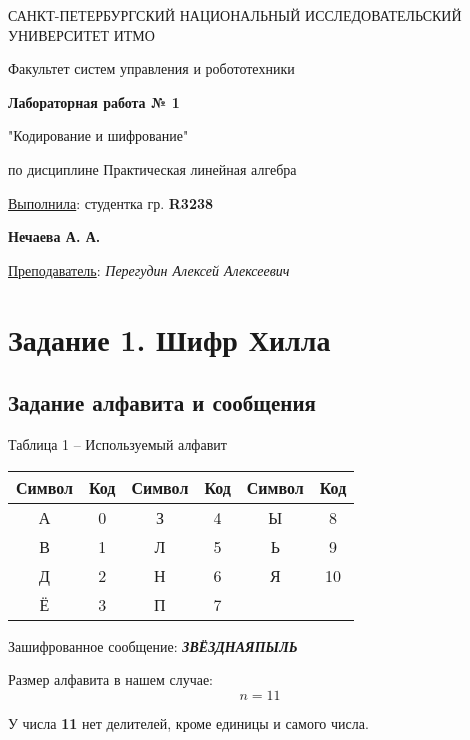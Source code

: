 \documentclass[a5paper, 10pt]{article}
\theoremstyle{definition}
\theoremstyle{plain}
\theoremstyle{remark}
\newcommand*{\titlePage}{
	\thispagestyle{title}
	\begingroup
	\begin{center}
		\vspace*{6ex}
		
		{\small
			САНКТ-ПЕТЕРБУРГСКИЙ НАЦИОНАЛЬНЫЙ ИССЛЕДОВАТЕЛЬСКИЙ УНИВЕРСИТЕТ ИТМО	
		}
		
		\vspace*{2ex}
		
		{\normalsize
			Факультет систем управления и робототехники
		}
		
		\vspace*{15ex}
		
		{\Large \bfseries 
			Лабораторная работа № 1
		}
\vspace*{2ex}
	{\Large \bfseries 
			
"Кодирование и шифрование"
		}
\vspace*{2ex}
		
		{\normalsize
			по дисциплине Практическая линейная алгебра
		}

	\end{center}
	\vspace*{20ex}
	\begin{flushright}
		{\large 
			\underline{Выполнила}: студентка гр. \textbf{R3238}\\
			\begin{flushright}
				\textbf{Нечаева А. А.}\\
			\end{flushright}
		}
		
		\vspace*{5ex}
		
		{\large 
			\underline{Преподаватель}: \textit{Перегудин Алексей Алексеевич}
		}
	\end{flushright}	
	\newpage
	\setcounter{page}{1}
	\endgroup}
\begin{document}
	\titlePage
	\pagestyle{style}
\newpage

\section{Задание 1. Шифр Хилла}
\subsection{Задание алфавита и сообщения}



\begin{center}
Таблица 1 -- Используемый алфавит\\
\begin{tabular}{ |c|c|c|c|c|c| } 
 \hline
Символ & Код & Символ & Код & Символ & Код\\
\hline
А & 0 & З  & 4 & Ы  & 8 \\
 \hline
В & 1 & Л & 5& Ь  & 9  \\
 \hline
Д & 2 & Н & 6& Я  & 10  \\
 \hline
Ё & 3 & П & 7&   &   \\
 \hline
\end{tabular}
\end{center}

Зашифрованное сообщение: \textbf{\textit{ЗВЁЗДНАЯПЫЛЬ}}

Размер алфавита в нашем случае: $$n = 11 $$

У числа  \textbf{11} нет делителей, кроме единицы и самого числа.
\end{document}
